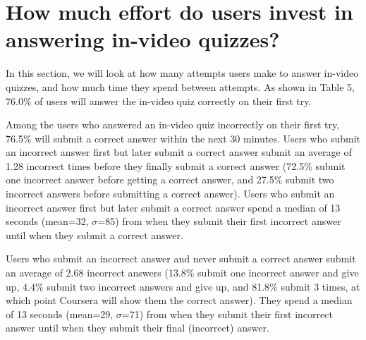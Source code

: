 \documentclass{sigchi}
\begin{document}



\section{How much effort do users invest in answering in-video quizzes?}

In this section, we will look at how many attempts users make to answer in-video quizzes, and how much time they spend between attempts. As shown in Table 5, 76.0\% of users will answer the in-video quiz correctly on their first try.



Among the users who answered an in-video quiz incorrectly on their first try, 76.5\% will submit a correct answer within the next 30 minutes. Users who submit an incorrect answer first but later submit a correct answer submit an average of 1.28 incorrect times before they finally submit a correct answer (72.5\% submit one incorrect answer before getting a correct answer, and 27.5\% submit two incorrect answers before submitting a correct answer). Users who submit an incorrect answer first but later submit a correct answer spend a median of 13 seconds (mean=32, $\sigma$=85) from when they submit their first incorrect answer until when they submit a correct answer.

Users who submit an incorrect answer and never submit a correct answer submit an average of 2.68 incorrect answers (13.8\% submit one incorrect answer and give up, 4.4\% submit two incorrect answers and give up, and 81.8\% submit 3 times, at which point Coursera will show them the correct answer). They spend a median of 13 seconds (mean=29, $\sigma$=71) from when they submit their first incorrect answer until when they submit their final (incorrect) answer.
\end{document}
